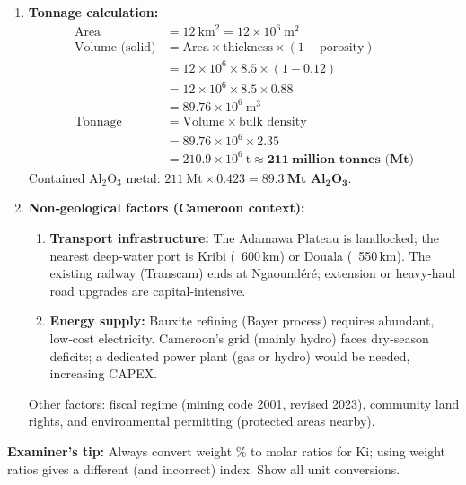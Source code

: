 \documentclass[11pt]{article}
\begin{document}
\begin{exoresolu}
\begin{enumerate}
\item \textbf{Tonnage calculation:}
\begin{align*}
\text{Area} &= 12\ \text{km}^2 = 12 \times 10^6\ \text{m}^2\\
\text{Volume (solid)} &= \text{Area} \times \text{thickness} \times (1 - \text{porosity})\\
&= 12 \times 10^6 \times 8.5 \times (1 - 0.12)\\
&= 12 \times 10^6 \times 8.5 \times 0.88\\
&= 89.76 \times 10^6\ \text{m}^3\\
\text{Tonnage} &= \text{Volume} \times \text{bulk density}\\
&= 89.76 \times 10^6 \times 2.35\\
&= 210.9 \times 10^6\ \text{t} \approx \mathbf{211\ \text{million tonnes (Mt)}}
\end{align*}
Contained Al$_2$O$_3$ metal:
$211\ \text{Mt} \times 0.423 = \mathbf{89.3\ \text{Mt Al}_2\text{O}_3}$.
\item \textbf{Non‑geological factors (Cameroon context):}
\begin{enumerate}
\item \textbf{Transport infrastructure:} The Adamawa Plateau is landlocked; the nearest deep‑water port is Kribi (~600\,km) or Douala (~550\,km). The existing railway (Transcam) ends at Ngaoundéré; extension or heavy‑haul road upgrades are capital‑intensive.
\item \textbf{Energy supply:} Bauxite refining (Bayer process) requires abundant, low‑cost electricity. Cameroon's grid (mainly hydro) faces dry‑season deficits; a dedicated power plant (gas or hydro) would be needed, increasing CAPEX.
\end{enumerate}
Other factors: fiscal regime (mining code 2001, revised 2023), community land rights, and environmental permitting (protected areas nearby).
\end{enumerate}
\textbf{Examiner's tip:} Always convert weight \% to molar ratios for Ki; using weight ratios gives a different (and incorrect) index. Show all unit conversions.
\end{exoresolu}
\end{document}
